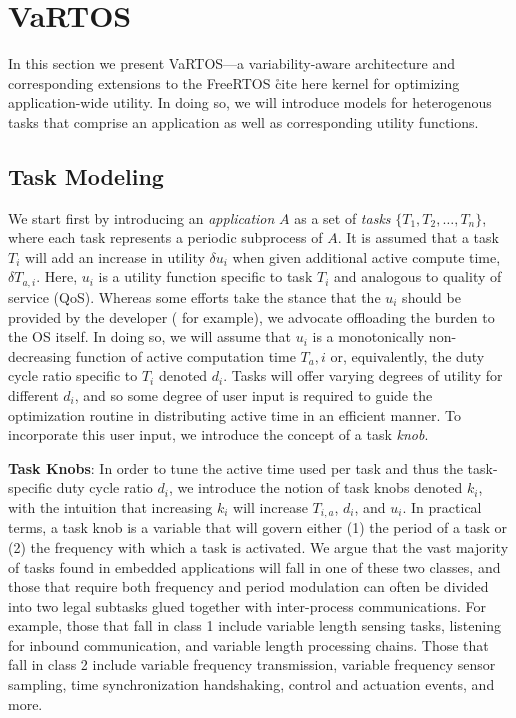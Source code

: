 \section{VaRTOS}
In this section we present VaRTOS---a variability-aware architecture and corresponding extensions to the FreeRTOS \r{cite here} kernel for optimizing application-wide utility.  In doing so, we will introduce models for heterogenous tasks that comprise an application as well as corresponding utility functions. 

\subsection{Task Modeling}
We start first by introducing an \emph{application} $A$ as a set of \emph{tasks} $\{T_1, T_2, \ldots, T_n \}$, where each task represents a periodic subprocess of $A$.  It is assumed that a task $T_i$ will add an increase in utility $\delta u_i$ when given additional active compute time, $\delta T_{a,i}$. Here, $u_i$ is a utility function specific to task $T_i$ and analogous to quality of service (QoS).  Whereas some efforts take the stance that the $u_i$ should be provided by the developer (\cite{green2010} for example), we advocate offloading the burden to the OS itself.  In doing so, we will assume that $u_i$ is a monotonically non-decreasing function of active computation time $T_a,i$ or, equivalently, the duty cycle ratio specific to $T_i$ denoted $d_i$.  Tasks will offer varying degrees of utility for different $d_i$, and so some degree of user input is required to guide the optimization routine in distributing active time in an efficient manner.  To incorporate this user input, we introduce the concept of a task \emph{knob}.

\noindent\textbf{Task Knobs}: 
In order to tune the active time used per task and thus the task-specific duty cycle ratio $d_i$, we introduce the notion of task knobs denoted $k_i$, with the intuition that increasing $k_i$ will increase $T_{i,a}$, $d_i$, and $u_i$.  In practical terms, a task knob is a variable that will govern either (1) the period of a task or (2) the frequency with which a task is activated. We argue that the vast majority of tasks found in embedded applications will fall in one of these two classes, and those that require both frequency and period modulation can often be divided into two legal subtasks glued together with inter-process communications. For example, those that fall in class 1 include variable length sensing tasks, listening for inbound communication, and variable length processing chains.  Those that fall in class 2 include variable frequency transmission, variable frequency sensor sampling, time synchronization handshaking, control and actuation events, and more.  

